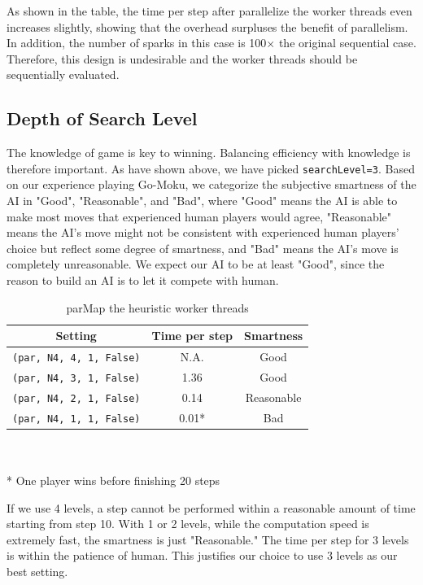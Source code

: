 \documentclass[twoside,11pt]{homework}
\begin{document}
As shown in the table, the time per step after parallelize the worker threads even increases slightly, showing that the overhead surpluses the benefit of parallelism. In addition, the number of sparks in this case is 100$\times$ the original sequential case. Therefore, this design is undesirable and the worker threads should be sequentially evaluated.

\subsection{Depth of Search Level}
The knowledge of game is key to winning. Balancing efficiency with knowledge is therefore important. As have shown above, we have picked \texttt{searchLevel=3}. Based on our experience playing Go-Moku, we categorize the subjective smartness of the AI in "Good", "Reasonable", and "Bad", where "Good" means the AI is able to make most moves that experienced human players would agree, "Reasonable" means the AI's move might not be consistent with experienced human players' choice but reflect some degree of smartness, and "Bad" means the AI's move is completely unreasonable. We expect our AI to be at least "Good", since the reason to build an AI is to let it compete with human.

\begin{table}[h!]
\centering
\begin{tabular}{||c c c||} 
 \hline
 Setting & Time per step & Smartness \\ [0.5ex] 
 \hline\hline
 \texttt{(par, N4, 4, 1, False)} & N.A. & Good \\
 \texttt{(par, N4, 3, 1, False)} & 1.36 & Good \\ [1ex]
 \texttt{(par, N4, 2, 1, False)} & 0.14 & Reasonable \\
 \texttt{(par, N4, 1, 1, False)} & 0.01* & Bad \\
 \hline
\end{tabular}
\\ \\ * One player wins before finishing 20 steps
\caption{parMap the heuristic worker threads}
\label{parMap-heuristic-workers}
\end{table}

If we use 4 levels, a step cannot be performed within a reasonable amount of time starting from step 10. With 1 or 2 levels, while the computation speed is extremely fast, the smartness is just "Reasonable." The time per step for 3 levels is within the patience of human. This justifies our choice to use 3 levels as our best setting.
\end{document}
